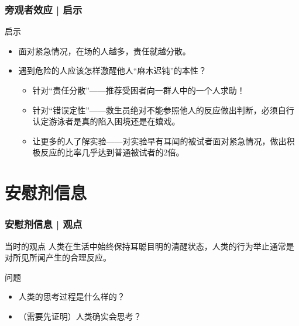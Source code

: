 \begin{frame}
  \frametitle{旁观者效应 | 启示}
  \begin{block}{启示}
    \begin{itemize}
      \item 面对紧急情况，在场的人越多，责任就越分散。
      \item 遇到危险的人应该怎样激醒他人“麻木迟钝”的本性？
        \begin{itemize}
          \item 针对“责任分散”——推荐受困者向一群人中的一个人求助！
          \item 针对“错误定性”——救生员绝对不能参照他人的反应做出判断，必须自行认定游泳者是真的陷入困境还是在嬉戏。
          \item 让更多的人了解实验——对实验早有耳闻的被试者面对紧急情况，做出积极反应的比率几乎达到普通被试者的2倍。
        \end{itemize}
    \end{itemize}
  \end{block}
\end{frame}

\section{安慰剂信息}
\begin{frame}
  \frametitle{安慰剂信息 | 观点}
  \begin{block}{当时的观点}
    人类在生活中始终保持耳聪目明的清醒状态，人类的行为举止通常是对所见所闻产生的合理反应。
  \end{block}
  \pause
  \begin{block}{问题}
    \begin{itemize}
      \item 人类的思考过程是什么样的？
      \item （需要先证明）人类确实会思考？
    \end{itemize}
  \end{block}
\end{frame}

